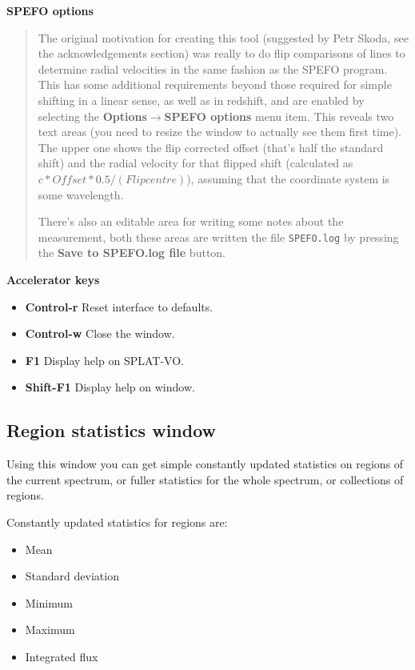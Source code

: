 \documentclass[twoside,11pt]{article}
\newcommand{\latexhtml}[2]{#1}
\renewcommand{\_}{\texttt{\symbol{95}}}
\newcommand{\SPLAT}{\textsf{SPLAT-VO}}
\newcommand{\submenuitem}[2]{\latexhtml{\textbf{#1$\rightarrow$#2}}{\textbf{#1->#2}}}
\newcommand{\labelitem}[1]{\textbf{#1}}
\newcommand{\hitext}[1]{\texttt{#1}}
\newcommand{\subheading}[1]{\textbf{\large{#1}}}
\begin{document}
\subheading{SPEFO options}
\begin{quote}
The original motivation for creating this tool (suggested by Petr Skoda, see
the acknowledgements section) was really to do flip comparisons of lines to
determine radial velocities in the same fashion as the SPEFO program. This has
some additional requirements beyond those required for simple shifting in a
linear sense, as well as in redshift, and are enabled by selecting the
\submenuitem{Options}{SPEFO options} menu item. This reveals two text areas
(you need to resize the window to actually see them first time). The upper one
shows the flip corrected offset (that's half the standard shift) and the
radial velocity for that flipped shift
(calculated as $c*Offset*0.5/(Flip centre)$), 
assuming that the coordinate system is some wavelength.

There's also an editable area for writing some notes about the measurement,
both these areas are written the file \hitext{SPEFO.log} by pressing the
\labelitem{Save to SPEFO.log file} button.

\end{quote}

\subheading{Accelerator keys}

\begin{itemize}
\item \labelitem{Control-r} Reset interface to defaults.
 
\item \labelitem{Control-w} Close the window.
\item \labelitem{F1} Display help on \SPLAT.     
\item \labelitem{Shift-F1} Display help on window.
\end{itemize}


\newpage
\subsection{Region statistics window}

Using this window you can get simple constantly updated statistics on regions
of the current spectrum, or fuller statistics for the whole spectrum, or
collections of regions.

Constantly updated statistics for regions are:
\begin{itemize}
\item Mean
\item Standard deviation
\item Minimum
\item Maximum
\item Integrated flux
\end{itemize}
\end{document}
